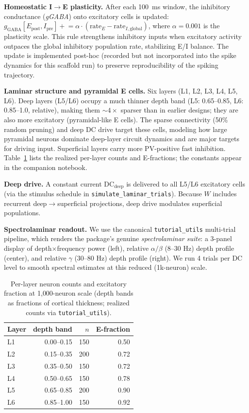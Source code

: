 \documentclass[11pt]{article}
\begin{document}
\textbf{Homeostatic I$\to$E plasticity.} After each 100~ms window, the inhibitory conductance
(\textit{gGABA}) onto excitatory cells is updated: $g_{\text{GABA}}[E_{\text{post}}, I_{\text{pre}}]
\mathrel{+}= \alpha \cdot (\text{rate}_E - \text{rate}_{I,\text{global}})$, where $\alpha = 0.001$
is the plasticity scale. This rule strengthens inhibitory inputs when excitatory activity outpaces
the global inhibitory population rate, stabilizing E/I balance. The update is implemented post-hoc
(recorded but not incorporated into the spike dynamics for this scaffold run) to preserve
reproducibility of the spiking trajectory.

\textbf{Laminar structure and pyramidal E cells.} Six layers (L1, L2, L3, L4, L5, L6). Deep layers (L5/L6) occupy
a much thinner depth band (L5: 0.65–0.85, L6: 0.85–1.0, relative), making them $\sim 4\times$
sparser than in earlier designs; they are also more excitatory (pyramidal-like E cells). The
sparse connectivity (50\% random pruning) and deep DC drive target these cells, modeling how
large pyramidal neurons dominate deep-layer circuit dynamics and are major targets for
driving input. Superficial layers carry more PV-positive fast inhibition. Table~\ref{tab:dens} lists the realized per-layer counts and
E-fractions; the constants appear in the companion notebook.

\textbf{Deep drive.} A constant current $\mathrm{DC}_{\text{deep}}$ is delivered to all
L5/L6 excitatory cells (via the stimulus schedule in \texttt{simulate\_laminar\_trials}).
Because $W$ includes recurrent deep$\to$superficial projections, deep drive modulates
superficial populations.

\textbf{Spectrolaminar readout.} We use the canonical \texttt{tutorial\_utils} multi-trial
pipeline, which renders the package's genuine \emph{spectrolaminar suite}: a 3-panel display
of depth$\times$frequency power (left), relative $\alpha/\beta$ (8--30 Hz) depth profile
(center), and relative $\gamma$ (30--80 Hz) depth profile (right). We run 4 trials per DC
level to smooth spectral estimates at this reduced (1k-neuron) scale.

\begin{table}[H]\centering\small
\caption{Per-layer neuron counts and excitatory fraction at 1{,}000-neuron scale
(depth bands as fractions of cortical thickness; realized counts via \texttt{tutorial\_utils}).}\label{tab:dens}
\begin{tabular}{lrrr}\toprule
Layer & depth band & $n$ & E-fraction \\\midrule
L1 & 0.00--0.15 & 150 & 0.50 \\
L2 & 0.15--0.35 & 200 & 0.72 \\
L3 & 0.35--0.50 & 150 & 0.72 \\
L4 & 0.50--0.65 & 150 & 0.78 \\
L5 & 0.65--0.85 & 200 & 0.90 \\
L6 & 0.85--1.00 & 150 & 0.92 \\
\bottomrule\end{tabular}
\end{table}
\end{document}
